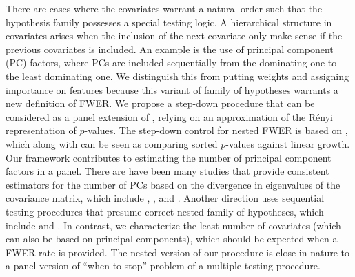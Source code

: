 \documentclass[11pt]{article}
\begin{document}
	
	There are cases where the covariates warrant a natural order such that the hypothesis family possesses a special testing logic. A hierarchical structure in covariates arises when the inclusion of the next covariate only make sense if the previous covariates is included. An example is the use of principal component (PC) factors, where PCs are included sequentially from the dominating one to the least dominating one. We distinguish this from putting weights and assigning importance on features because this variant of family of hypotheses warrants a new definition of FWER. We propose a step-down procedure that can be considered as a panel extension of \cite{rssb.12122}, relying on an approximation of the R\'enyi representation of $p$-values. The step-down control for nested FWER is based on \cite{2336545}, which along with \cite{Bonf} can be seen as comparing sorted $p$-values against linear growth. Our framework contributes to estimating the number of principal component factors in a panel. There are have been many studies that provide consistent estimators for the number of PCs based on the divergence in eigenvalues of the covariance matrix, which include \cite{1468-0262.00273}, \cite{40985808}, \cite{ECTA8968} and \cite{PELGER201923}. Another direction uses sequential testing procedures that presume correct nested family of hypotheses, which include \cite{jbes.2009.07239} and \cite{16-AOS1536}. In contrast, we characterize the least number of covariates (which can also be based on principal components), which should be expected when a FWER rate is provided. The nested version of our procedure is close in nature to a panel version of ``when-to-stop'' problem of a multiple testing procedure.
	
	
	
	
	
\end{document}
